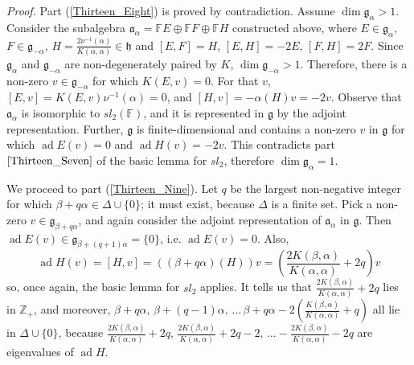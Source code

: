 \documentclass{article}
\newcommand{\ad}{\operatorname{ad}}
\begin{document}
\emph{Proof.} Part (\ref{Thirteen_Eight}) is proved by contradiction. Assume $\dim {\mathfrak g}_\alpha > 1$. Consider the subalgebra ${\mathfrak a}_\alpha = \mathbb{F}E \oplus \mathbb{F}F \oplus \mathbb{F}H$ constructed above, where $E \in {\mathfrak g}_\alpha$, $F \in {\mathfrak g}_{-\alpha}$, $H = \frac{2 \nu^{-1}(\alpha)}{K(\alpha, \alpha)} \in {\mathfrak h}$ and $[E, F]=H$, $[E, H] = -2E$, $[F, H] = 2F$. Since ${\mathfrak g}_\alpha$ and ${\mathfrak g}_{-\alpha}$ are non-degenerately paired by $K$, $\dim {\mathfrak g}_{-\alpha} > 1$. Therefore, there is a non-zero $v \in {\mathfrak g}_{-\alpha}$ for which $K(E, v)=0$. For that $v$, $[E, v]=K(E, v)\nu^{-1}(\alpha) = 0$, and $[H, v]= -\alpha (H)v = -2v$. Observe that ${\mathfrak a}_\alpha$ is isomorphic to $sl_2(\mathbb{F})$, and it is represented in ${\mathfrak g}$ by the adjoint representation. Further, ${\mathfrak g}$ is finite-dimensional and contains a non-zero $v$ in ${\mathfrak g}$ for which $\ad E(v)=0$ and $\ad H(v)=-2v$. This contradicts part $\ref{Thirteen_Seven}$ of the basic lemma for $sl_2$, therefore $\dim {\mathfrak g}_\alpha= 1$.

We proceed to part (\ref{Thirteen_Nine}). Let $q$ be the largest non-negative integer for which $\beta + q\alpha \in \Delta \cup \{ 0\}$; it must exist, because $\Delta$ is a finite set. Pick a non-zero $v \in {\mathfrak g}_{\beta + q \alpha}$, and again consider the adjoint representation of ${\mathfrak a}_\alpha$ in ${\mathfrak g}$. Then $\ad E (v) \in {\mathfrak g}_{\beta + (q+1)\alpha} = \{ 0 \}$, i.e. $\ad E (v) =0$. Also, 
$$
\ad H (v) = [H, v] = ((\beta + q \alpha)(H))v = \left( \frac{2 K(\beta, \alpha)}{K(\alpha, \alpha)} + 2 q \right) v
$$
so, once again, the basic lemma for $sl_2$ applies. It tells us that $\frac{2 K(\beta, \alpha)}{K(\alpha, \alpha)} + 2 q$ lies in $\mathbb{Z}_+$, and moreover, $\beta + q\alpha ,\, \beta+ (q-1)\alpha ,\, \ldots \, \beta + q\alpha -2 \left( \frac{K(\beta, \alpha)}{K(\alpha, \alpha)} + q \right)$ all lie in $\Delta \cup \{ 0 \}$, because $\frac{2 K(\beta, \alpha)}{K (\alpha, \alpha)} +2q,\, \frac{2 K(\beta, \alpha)}{K (\alpha, \alpha)} +2q -2,\, \ldots -\frac{2 K(\beta, \alpha)}{K (\alpha, \alpha)} -2q$ are eigenvalues of $\ad H$.
\end{document}
